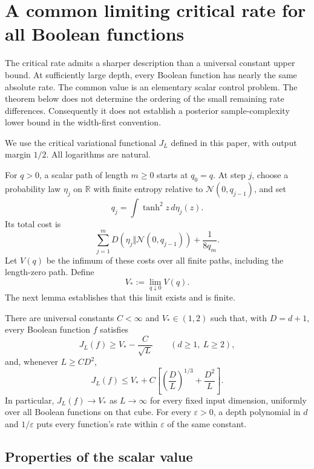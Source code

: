 \section{A common limiting critical rate for all Boolean functions}
\label{sec:critical-rate-flattening}

The critical rate admits a sharper description than a universal constant
upper bound. At sufficiently large depth, every Boolean function has
nearly the same absolute rate. The common value is an elementary scalar
control problem. The theorem below does not determine the ordering of
the small remaining rate differences. Consequently it does not establish
a posterior sample-complexity lower bound in the width-first convention.

We use the critical variational functional $J_L$ defined in this paper,
with output margin $1/2$. All logarithms are natural.

\begin{definition}
For $q>0$, a scalar path of length $m\ge0$ starts at $q_0=q$.
At step $j$, choose a probability law $\eta_j$ on $\mathbb R$ with
finite entropy relative to $\mathcal N(0,q_{j-1})$, and set
\[
 q_j=\int\tanh^2 z\,d\eta_j(z).
\]
Its total cost is
\[
 \sum_{j=1}^{m}D(\eta_j\Vert\mathcal N(0,q_{j-1}))
       +\frac1{8q_m}.
\]
Let $V(q)$ be the infimum of these costs over all finite paths, including
the length-zero path. Define
\[
 V_*:=\lim_{q\downarrow0}V(q).
\]
The next lemma establishes that this limit exists and is finite.
\end{definition}

\begin{theorem}
\label{thm:critical-rate-flattening}
There are universal constants $C<\infty$ and $V_*\in(1,2)$ such that,
with $D=d+1$, every Boolean function $f$ satisfies
\[
 J_L(f)\ge V_*-\frac C{\sqrt L}\qquad(d\ge1,\ L\ge2),
\]
and, whenever $L\ge C D^2$,
\[
 J_L(f)\le V_*+
 C\left[\left(\frac DL\right)^{1/3}+\frac{D^2}{L}\right].
\]
In particular, $J_L(f)\to V_*$ as $L\to\infty$ for every fixed input
dimension, uniformly over all Boolean functions on that cube. For every
$\varepsilon>0$, a depth polynomial in $d$ and $1/\varepsilon$ puts
every function's rate within $\varepsilon$ of the same constant.
\end{theorem}

\subsection{Properties of the scalar value}

